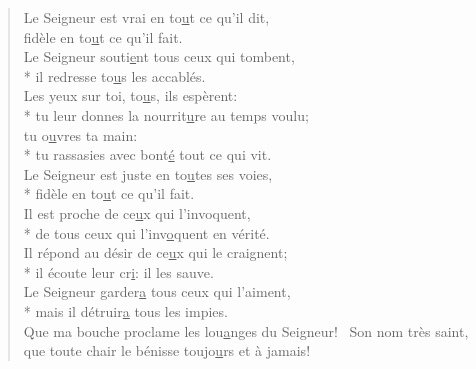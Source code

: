 \begin{verse}
Le Seigneur est vrai en to\underline{u}t ce qu’il dit, \\
fidèle en to\underline{u}t ce qu’il fait. \\
Le Seigneur souti\underline{e}nt tous ceux qui tombent, \\*
il redresse to\underline{u}s les accablés. \\

Les yeux sur toi, to\underline{u}s, ils espèrent: \\*
tu leur donnes la nourrit\underline{u}re au temps voulu; \\
tu o\underline{u}vres ta main: \\*
tu rassasies avec bont\underline{é} tout ce qui vit. \\

Le Seigneur est juste en to\underline{u}tes ses voies, \\*
fidèle en to\underline{u}t ce qu’il fait. \\
Il est proche de ce\underline{u}x qui l’invoquent, \\*
de tous ceux qui l’inv\underline{o}quent en vérité. \\

Il répond au désir de ce\underline{u}x qui le craignent; \\*
il écoute leur cr\underline{i}: il les sauve. \\
Le Seigneur garder\underline{a} tous ceux qui l’aiment, \\*
mais il détruir\underline{a} tous les impies. \\

Que ma bouche proclame les lou\underline{a}nges du Seigneur!~\psalmstar
Son nom très saint, que toute chair le bénisse
toujo\underline{u}rs et à jamais! \\
\end{verse}

